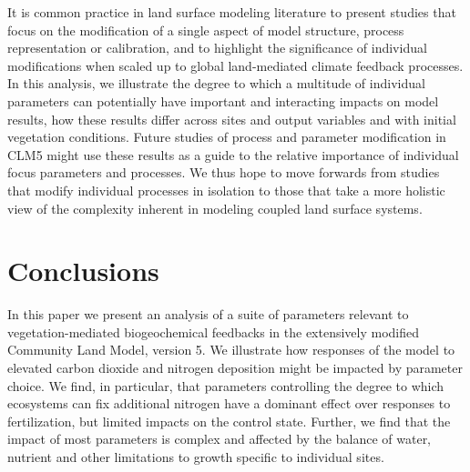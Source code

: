 \documentclass[draft,linenumbers]{agujournal}
\begin{document}
It is common practice in land surface modeling literature to present studies that focus on the modification of a single aspect of model structure, process representation or calibration, and to highlight the significance of individual modifications when scaled up to global land-mediated climate feedback processes. In this analysis, we illustrate the degree to which a multitude of individual parameters can potentially have important and interacting impacts on model results, how these results differ across sites and output variables and with initial vegetation conditions.  Future studies of process and parameter modification in CLM5 might use these results as a guide to the relative importance of individual focus parameters and processes. We thus hope to move forwards from studies that modify individual processes in isolation to those that take a more holistic view of the complexity inherent in modeling coupled land surface systems.

\section{Conclusions}
In this paper we present an analysis of a suite of parameters relevant to vegetation-mediated biogeochemical feedbacks in the extensively modified Community Land Model, version 5. We illustrate how responses of the model to elevated carbon dioxide and nitrogen deposition might be impacted by parameter choice. We find, in particular, that parameters controlling the degree to which ecosystems can fix additional nitrogen have a dominant effect over responses to fertilization, but limited impacts on the control state. Further, we find that the impact of most parameters is complex and affected by the balance of water, nutrient and other limitations to growth specific to individual sites.
\end{document}
